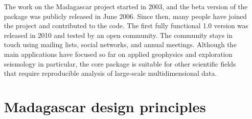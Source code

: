 The work on the Madagascar project started in 2003, and the beta
version of the package was publicly released in June 2006. Since then,
many people have joined the project and contributed to the code. The
first fully functional 1.0 version was released in 2010 and tested by
an open community. The community stays in touch using mailing lists,
social networks, and annual meetings.  Although the main applications
have focused so far on applied geophysics and exploration seismology
in particular, the core package is suitable for other scientific
fields that require reproducible analysis of large-scale
multidimensional data.

\section{Madagascar design principles}

